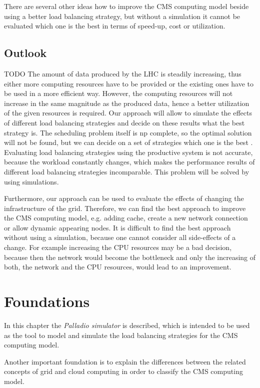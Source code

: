 There are several other ideas how to improve the CMS computing model beside using a better load balancing strategy, but without a simulation it cannot be evaluated which one is the best in terms of speed-up, cost or utilization.
\newpage

\section{Outlook} TODO 
The amount of data produced by the LHC is steadily increasing, thus either more computing resources have to be provided or the existing ones have to be used in a more efficient way.
However, the computing resources will not increase in the same magnitude as the produced data, hence a better utilization of the given resources is required. Our approach will allow to simulate the effects of different load balancing strategies and decide on these results what the best strategy is. The scheduling problem itself is np complete, so the optimal solution will not be found, but we can decide on a set of strategies which one is the best \cite{1698650}. Evaluating load balancing strategies using the productive system is not accurate, because the workload constantly changes, which makes the performance results of different load balancing strategies incomparable. This problem will be solved by using simulations.

Furthermore, our approach can be used to evaluate the effects of changing the infrastructure of the grid. Therefore, we can find the best approach to improve the CMS computing model, e.g. adding cache, create a new network connection or allow dynamic appearing nodes.
It is difficult to find the best approach without using a simulation, because one cannot consider all side-effects of a change. For example increasing the CPU resources may be a bad decision, because then the network would become the bottleneck and only the increasing of both, the network and the CPU resources, would lead to an improvement.

\chapter {Foundations}
In this chapter the \textit{Palladio simulator} is described, which is intended to be used as the tool to model and simulate the load balancing strategies for the CMS computing model.

Another important foundation is to explain the differences between the related concepts of grid and cloud computing in order to classify the CMS computing model.

